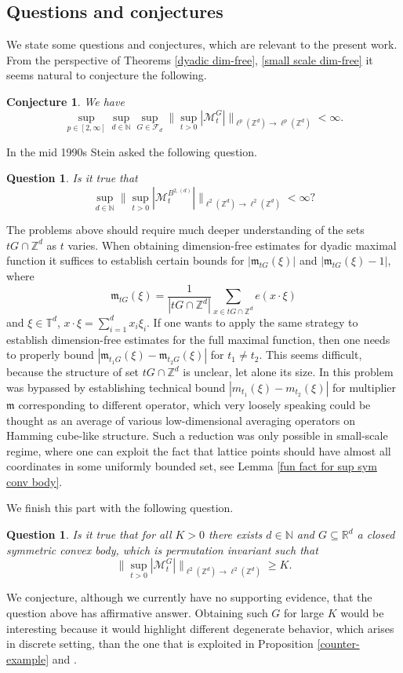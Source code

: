 \documentclass[a4paper,oneside, reqno]{amsart}
\numberwithin{equation}{section}
\newtheorem{Conj}[Thm]{Conjecture}
\newtheorem{Que}[Thm]{Question}
\theoremstyle{definition}%
\theoremstyle{definition}
\theoremstyle{definition}%
\theoremstyle{definition}
\newcommand{\Z}{\mathbb{Z}}
\newcommand{\R}{\mathbb{R}}
\newcommand{\N}{\mathbb{N}}
\newcommand{\T}{\mathbb{T}}
\begin{document}
\subsection{Questions and conjectures}
We state some questions and conjectures, which are relevant to the present work.
From the perspective of Theorems \ref{dyadic dim-free}, \ref{small scale dim-free} it seems natural to conjecture the following.
\begin{Conj}\label{dim free conjecture}
    We have 
 \[
 \sup_{p \in [2,\infty]} \sup_{d \in \N} \sup_{G \in \mathcal{F}_d} \Big\| \sup_{t>0} |\mathcal{M}_{t}^G| \Big\|_{\ell^p(\Z^d) \to \ell^p(\Z^d)}< \infty.
 \] 
\end{Conj}
In the mid 1990s Stein asked the following question.
\begin{Que}
    Is it true that 
    \[
    \sup_{d \in \N}  \Big\| \sup_{t>0} |\mathcal{M}_{t}^{B^{2,(d)}}| \Big\|_{\ell^2(\Z^d) \to \ell^2(\Z^d)}< \infty ?
    \]
\end{Que}
The problems above should require much deeper understanding of the sets $tG \cap \Z^d$ as $t$ varies. When obtaining dimension-free estimates for dyadic maximal function it suffices to establish certain bounds for $|\mathfrak{m}_{tG}(\xi)|$ and $|\mathfrak{m}_{tG}(\xi)-1|$, where 
\[
\mathfrak{m}_{tG}(\xi)= \frac{1}{|tG \cap \Z^d|} \sum_{x \in tG \cap \Z^d} e(x \cdot \xi)
\]
and $\xi \in \T^d$, $x \cdot \xi= \sum_{i=1}^d x_i \xi_i$. If one wants to apply the same strategy to establish dimension-free estimates for the full maximal function, then one needs to properly bound $|\mathfrak{m}_{t_1G}(\xi)-\mathfrak{m}_{t_2G}(\xi)|$ for $t_1 \neq t_2$. This seems difficult, because the structure of set $t G \cap \Z^d$ is unclear, let alone its size. In \cite{NW} this problem was bypassed by establishing technical bound $|m_{t_1}(\xi)-m_{t_2}(\xi)|$ for multiplier $\mathfrak{m}$ corresponding to different operator, which very loosely speaking could be thought as an average of various low-dimensional averaging operators on Hamming cube-like structure. Such a reduction was only possible in small-scale regime, where one can exploit the fact that lattice points should have almost all coordinates in some uniformly bounded set, see Lemma \ref{fun fact for sup sym conv body}.
\par We finish this part with the following question.
\begin{Que}
    Is it true that for all $K>0$ there exists $d \in \N$ and $G \subseteq \R^d$ a closed symmetric convex body, which is permutation invariant such that 
    \[
    \Big\| \sup_{t>0} |\mathcal{M}_t^G| \Big\|_{\ell^2(\Z^d) \to \ell^2(\Z^d)} \ge K.
    \]
\end{Que}
We conjecture, although we currently have no supporting evidence, that the question above has affirmative answer. Obtaining such $G$ for large $K$ would be interesting because it would highlight different degenerate behavior, which arises in discrete setting, than the one that is exploited in Proposition \ref{counter-example} and \cite[Theorem 2]{cubes}.
\end{document}
